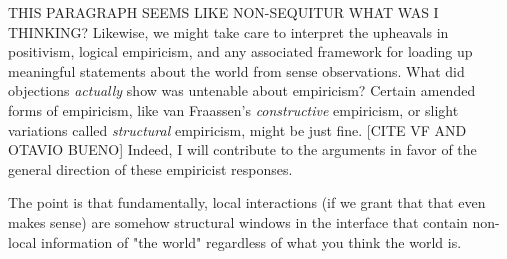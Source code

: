 \documentclass{article}
\begin{document}
THIS PARAGRAPH SEEMS LIKE NON-SEQUITUR WHAT WAS I THINKING?
Likewise, we might take care to interpret the upheavals in positivism, logical empiricism, and any associated framework for loading up meaningful statements about the world from sense observations.  What did objections \emph{actually} show was untenable about empiricism?  Certain amended forms of empiricism, like van Fraassen's \emph{constructive} empiricism, or slight variations called \emph{structural} empiricism, might be just fine.  [CITE VF AND OTAVIO BUENO]  Indeed, I will contribute to the arguments in favor of the general direction of these empiricist responses. 

The point is that fundamentally, local interactions (if we grant that that even makes sense) are somehow structural windows in the interface that contain non-local information of "the world" regardless of what you think the world is.




\end{document}
